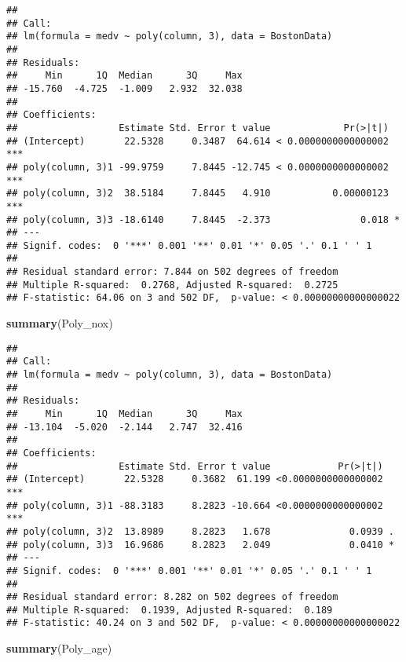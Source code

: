\documentclass[]{article}
\newenvironment{Shaded}{\begin{snugshade}}{\end{snugshade}}
\newcommand{\KeywordTok}[1]{\textcolor[rgb]{0.13,0.29,0.53}{\textbf{#1}}}
\newcommand{\NormalTok}[1]{#1}
\begin{document}
\begin{verbatim}
## 
## Call:
## lm(formula = medv ~ poly(column, 3), data = BostonData)
## 
## Residuals:
##     Min      1Q  Median      3Q     Max 
## -15.760  -4.725  -1.009   2.932  32.038 
## 
## Coefficients:
##                  Estimate Std. Error t value             Pr(>|t|)    
## (Intercept)       22.5328     0.3487  64.614 < 0.0000000000000002 ***
## poly(column, 3)1 -99.9759     7.8445 -12.745 < 0.0000000000000002 ***
## poly(column, 3)2  38.5184     7.8445   4.910           0.00000123 ***
## poly(column, 3)3 -18.6140     7.8445  -2.373                0.018 *  
## ---
## Signif. codes:  0 '***' 0.001 '**' 0.01 '*' 0.05 '.' 0.1 ' ' 1
## 
## Residual standard error: 7.844 on 502 degrees of freedom
## Multiple R-squared:  0.2768, Adjusted R-squared:  0.2725 
## F-statistic: 64.06 on 3 and 502 DF,  p-value: < 0.00000000000000022
\end{verbatim}

\begin{Shaded}
\begin{Highlighting}[]
\KeywordTok{summary}\NormalTok{(Poly_nox)}
\end{Highlighting}
\end{Shaded}

\begin{verbatim}
## 
## Call:
## lm(formula = medv ~ poly(column, 3), data = BostonData)
## 
## Residuals:
##     Min      1Q  Median      3Q     Max 
## -13.104  -5.020  -2.144   2.747  32.416 
## 
## Coefficients:
##                  Estimate Std. Error t value            Pr(>|t|)    
## (Intercept)       22.5328     0.3682  61.199 <0.0000000000000002 ***
## poly(column, 3)1 -88.3183     8.2823 -10.664 <0.0000000000000002 ***
## poly(column, 3)2  13.8989     8.2823   1.678              0.0939 .  
## poly(column, 3)3  16.9686     8.2823   2.049              0.0410 *  
## ---
## Signif. codes:  0 '***' 0.001 '**' 0.01 '*' 0.05 '.' 0.1 ' ' 1
## 
## Residual standard error: 8.282 on 502 degrees of freedom
## Multiple R-squared:  0.1939, Adjusted R-squared:  0.189 
## F-statistic: 40.24 on 3 and 502 DF,  p-value: < 0.00000000000000022
\end{verbatim}

\begin{Shaded}
\begin{Highlighting}[]
\KeywordTok{summary}\NormalTok{(Poly_age)}
\end{Highlighting}
\end{Shaded}
\end{document}
